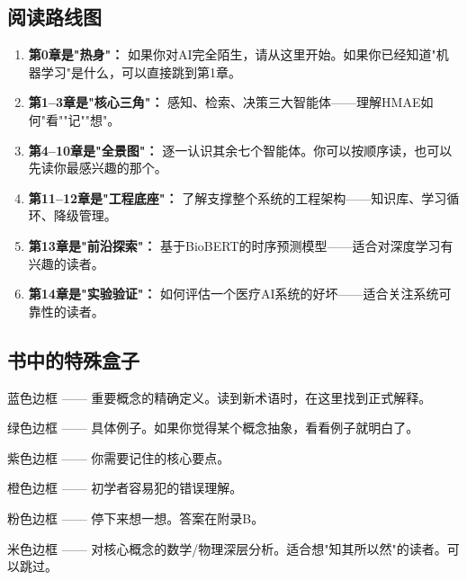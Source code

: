 \documentclass[11pt,a4paper]{ctexart}
\begin{document}
\subsection*{阅读路线图}

\begin{enumerate}[nosep]
\item \textbf{第0章是"热身"：} 如果你对AI完全陌生，请从这里开始。如果你已经知道"机器学习"是什么，可以直接跳到第1章。
\item \textbf{第1--3章是"核心三角"：} 感知、检索、决策三大智能体——理解HMAE如何"看""记""想"。
\item \textbf{第4--10章是"全景图"：} 逐一认识其余七个智能体。你可以按顺序读，也可以先读你最感兴趣的那个。
\item \textbf{第11--12章是"工程底座"：} 了解支撑整个系统的工程架构——知识库、学习循环、降级管理。
\item \textbf{第13章是"前沿探索"：} 基于BioBERT的时序预测模型——适合对深度学习有兴趣的读者。
\item \textbf{第14章是"实验验证"：} 如何评估一个医疗AI系统的好坏——适合关注系统可靠性的读者。
\end{enumerate}

\subsection*{书中的特殊盒子}

\begin{defbox}[定义盒子]
蓝色边框 —— 重要概念的精确定义。读到新术语时，在这里找到正式解释。
\end{defbox}

\begin{exambox}[例子盒子]
绿色边框 —— 具体例子。如果你觉得某个概念抽象，看看例子就明白了。
\end{exambox}

\begin{keybox}[关键洞察]
紫色边框 —— 你需要记住的核心要点。
\end{keybox}

\begin{warnbox}[常见误区]
橙色边框 —— 初学者容易犯的错误理解。
\end{warnbox}

\begin{exerbox}[思考题]
粉色边框 —— 停下来想一想。答案在附录B。
\end{exerbox}

\begin{deepbox}[深入理解]
米色边框 —— 对核心概念的数学/物理深层分析。适合想"知其所以然"的读者。可以跳过。
\end{deepbox}
\end{document}
